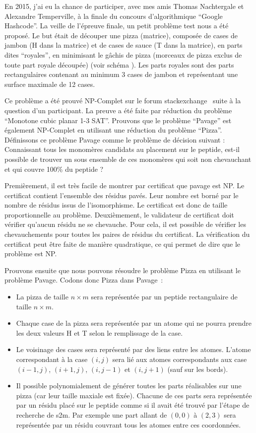 En 2015, j'ai eu la chance de participer, avec mes amis Thomas Nachtergale et Alexandre Temperville, à la finale du concours d'algorithmique ``Google Hashcode''.
La veille de l'épreuve finale, un petit problème test nous a été proposé.
Le but était de découper une pizza (matrice), composée de cases de jambon (H dans la matrice) et de cases de sauce (T dans la matrice), en parts dites ``royales'', en minimisant le gâchis de pizza (morceaux de pizza exclus de toute part royale découpée) (voir schéma \cite{pizza}).
Les parts royales sont des parts rectangulaires contenant au minimum 3 cases de jambon et représentant une surface maximale de 12 cases.

Ce problème a été prouvé NP-Complet sur le forum stackexchange~\cite{de_biasi_complexity_2015} suite à la question d'un participant.
La preuve a été faite par réduction du problème ``Monotone cubic planar 1-3 SAT''.
Prouvons que le problème ``Pavage'' est également NP-Complet en utilisant une réduction du problème ``Pizza''.
Définissons ce problème Pavage comme le problème de décision suivant : Connaissant tous les monomères candidats au placement sur le peptide, est-il possible de trouver un sous ensemble de ces monomères qui soit non chevauchant et qui couvre 100\% du peptide ?

Premièrement, il est très facile de montrer par certificat que pavage est NP.
Le certificat contient l'ensemble des résidus pavés.
Leur nombre est borné par le nombre de résidus issus de l'isomorphisme.
Le certificat est donc de taille proportionnelle au problème.
Deuxièmement, le validateur de certificat doit vérifier qu'aucun résidu ne se chevauche.
Pour cela, il est possible de vérifier les chevauchements pour toutes les paires de résidus du certificat.
La vérification du certificat peut être faite de manière quadratique, ce qui permet de dire que le problème est NP.

Prouvons ensuite que nous pouvons résoudre le problème Pizza en utilisant le problème Pavage.
Codons donc Pizza dans Pavage~:
\begin{itemize}
	\item La pizza de taille $n \times m$ sera représentée par un peptide rectangulaire de taille $n \times m$.
	\item Chaque case de la pizza sera représentée par un atome qui ne pourra prendre les deux valeurs H et T selon le remplissage de la case.
	\item Le voisinage des cases sera représenté par des liens entre les atomes.
	L'atome correspondant à la case $(i,j)$ sera lié aux atomes correspondants aux case $(i-1,j)$, $(i+1,j)$, $(i,j-1)$ et $(i,j+1)$ (sauf sur les bords).
	\item Il possible polynomialement de générer toutes les parts réalisables sur une pizza (car leur taille maxiale est fixée).
	Chacune de ces parts sera représentée par un résidu placé sur le peptide comme si il avait été trouvé par l'étape de recherche de s2m.
	Par exemple une part allant de $(0,0)$ à $(2,3)$ sera représentée par un résidu couvrant tous les atomes entre ces coordonnées.
\end{itemize}

